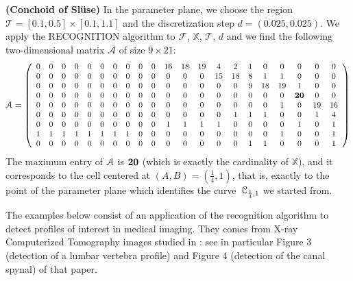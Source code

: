 \documentclass[10pt]{article}
\newcommand\sA{{\cal A}}
\newcommand\sC{{\cal C}}
\newtheorem{examp}[theorem]{Example}
\newenvironment{example*}{\begin{examp}\em}{\end{examp}}
\begin{document}
{\begin{example*}{\bf (Conchoid of Sl\"use)}
In the parameter plane, we choose the region $\mathcal T = [0.1,0.5] \times [0.1, 1.1]$
and the discretization step $d=(0.025,0.025)$.
We apply the RECOGNITION algorithm to 
$\mathcal F$, $\mathbb X$, $\mathcal T$, $d$ and we find the following two-dimensional
matrix $\mathcal A$ of size $9 \times 21$:
\begin{eqnarray*}
\small{
\sA = \left ( \begin{array}{ c c c c c c c c c c c c c c c c c c c c c}  
0 & 0 & 0 & 0 & 0 & 0 & 0 & 0 & 0 & 0 & 16 & 18 & 19 & 4 & 2 & 1 & 0 & 0 & 0 & 0 & 0\\
  0 & 0 & 0 & 0 & 0 & 0 & 0 & 0 & 0 & 0 & 0 & 0 & 0 & 15 & 18 & 8 & 1 & 1 & 0 & 0 & 0\\
  0 & 0 & 0 & 0 & 0 & 0 & 0 & 0 & 0 & 0 & 0 & 0 & 0 & 0 & 0 & 9 & 18 & 19 & 1 & 0 & 0\\
  0 & 0 & 0 & 0 & 0 & 0 & 0 & 0 & 0 & 0 & 0 & 0 & 0 & 0 & 0 & 0 & 0 & 0 & \bf{20} & 0 & 0\\
  0 & 0 & 0 & 0 & 0 & 0 & 0 & 0 & 0 & 0 & 0 & 0 & 0 & 0 & 0 & 0 & 0 & 1 & 0 & 19 & 16\\
  0 & 0 & 0 & 0 & 0 & 0 & 0 & 0 & 0 & 0 & 0 & 0 & 0 & 0 & 1 & 1 & 1 & 0 & 0 & 1 & 4\\
  0 & 0 & 0 & 0 & 0 & 0 & 0 & 0 & 0 & 0 & 1 & 1 & 1 & 1 & 0 & 0 & 0 & 0 & 1 & 0 & 1\\
  1 & 1 & 1 & 1 & 1 & 1 & 1 & 1 & 0 & 0 & 0 & 0 & 0 & 0 & 0 & 0 & 0 & 1 & 0 & 0 & 1\\
  0 & 0 & 0 & 0 & 0 & 0 & 0 & 0 & 0 & 0 & 0 & 0 & 0 & 0 & 0 & 1 & 1 & 0 & 0 & 0 & 1
 \end{array} \right )
 }
\end{eqnarray*}
The maximum entry of $\sA$ is $\bf{20}$ (which is exactly the cardinality of $\mathbb X$), and it 
corresponds to the cell centered at $(A,B)= (\frac{1}{4},1)$, that is, exactly to 
the point of the parameter plane which identifies the curve~$\sC_{\frac{1}{4}, 1}$ 
we started from.
\end{example*}

The  examples below  consist of an application
of the recognition algorithm to detect profiles of interest in medical imaging. They comes from  X-ray Computerized Tomography images  studied in \cite{etal}: see in particular Figure 3 (detection of a lumbar vertebra profile) and Figure 4 (detection  of the canal spynal) of that paper.

}
\end{document}
